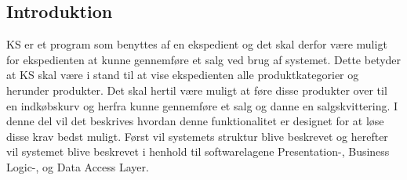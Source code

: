\subsection{Introduktion}
\gls{KS} er et program som benyttes af en ekspedient og det skal derfor være muligt for ekspedienten at kunne gennemføre et salg ved brug af systemet. Dette betyder at \gls{KS} skal være i stand til at vise ekspedienten alle produktkategorier og herunder produkter. Det skal hertil være muligt at føre disse produkter over til en indkøbskurv og herfra kunne gennemføre et salg og danne en salgskvittering. I denne del vil det beskrives hvordan denne funktionalitet er designet for at løse disse krav bedst muligt. Først vil systemets struktur blive beskrevet og herefter vil systemet blive beskrevet i henhold til softwarelagene Presentation-, Business Logic-, og Data Access Layer.\\

